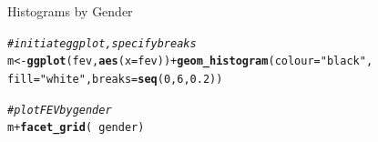 \documentclass[10pt]{beamer}\usepackage[]{graphicx}\usepackage[]{color}
\makeatletter
\newcommand{\hlnum}[1]{\textcolor[rgb]{0.686,0.059,0.569}{#1}}%
\newcommand{\hlstr}[1]{\textcolor[rgb]{0.192,0.494,0.8}{#1}}%
\newcommand{\hlcom}[1]{\textcolor[rgb]{0.678,0.584,0.686}{\textit{#1}}}%
\newcommand{\hlopt}[1]{\textcolor[rgb]{0,0,0}{#1}}%
\newcommand{\hlstd}[1]{\textcolor[rgb]{0.345,0.345,0.345}{#1}}%
\newcommand{\hlkwb}[1]{\textcolor[rgb]{0.69,0.353,0.396}{#1}}%
\newcommand{\hlkwc}[1]{\textcolor[rgb]{0.333,0.667,0.333}{#1}}%
\newcommand{\hlkwd}[1]{\textcolor[rgb]{0.737,0.353,0.396}{\textbf{#1}}}%
\newenvironment{kframe}{%
 \def\at@end@of@kframe{}%
 \ifinner\ifhmode%
  \def\at@end@of@kframe{\end{minipage}}%
  \begin{minipage}{\columnwidth}%
 \fi\fi%
 \def\FrameCommand##1{\hskip\@totalleftmargin \hskip-\fboxsep
 \colorbox{shadecolor}{##1}\hskip-\fboxsep
     \hskip-\linewidth \hskip-\@totalleftmargin \hskip\columnwidth}%
 \MakeFramed {\advance\hsize-\width
   \@totalleftmargin\z@ \linewidth\hsize
   \@setminipage}}%
 {\par\unskip\endMakeFramed%
 \at@end@of@kframe}
\newenvironment{knitrout}{}{} %
\makeatother
\begin{document}
\begin{frame}[fragile]{Histograms by Gender}
\begin{knitrout}\footnotesize
{}\color{fgcolor}\begin{kframe}
\begin{alltt}
\hlcom{# initiate ggplot, specify breaks}
\hlstd{m} \hlkwb{<-} \hlkwd{ggplot}\hlstd{(fev,} \hlkwd{aes}\hlstd{(}\hlkwc{x} \hlstd{= fev))} \hlopt{+} \hlkwd{geom_histogram}\hlstd{(}\hlkwc{colour} \hlstd{=} \hlstr{"black"}\hlstd{,}
    \hlkwc{fill} \hlstd{=} \hlstr{"white"}\hlstd{,} \hlkwc{breaks} \hlstd{=} \hlkwd{seq}\hlstd{(}\hlnum{0}\hlstd{,} \hlnum{6}\hlstd{,} \hlnum{0.2}\hlstd{))}
\end{alltt}
\end{kframe}
\end{knitrout}
\pause
\begin{knitrout}
\color{fgcolor}\begin{kframe}
\begin{alltt}
\hlcom{# plot FEV by gender}
\hlstd{m} \hlopt{+} \hlkwd{facet_grid}\hlstd{(}\hlopt{~}\hlstd{gender)}
\end{alltt}
\end{kframe}
\end{knitrout}

\end{frame}
\end{document}
